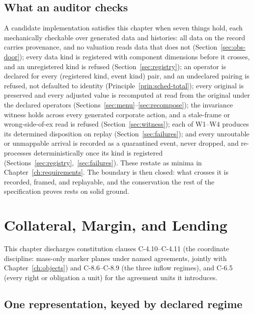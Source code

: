 \documentclass[11pt,a4paper]{article}
\begin{document}
\subsection{What an auditor checks}

A candidate implementation satisfies this chapter when seven things hold, each mechanically
checkable over generated data and histories: all data on the record carries provenance,
and no valuation reads data that does not (Section~\ref{sec:obs-door}); every data kind
is registered with component dimensions before it crosses, and an unregistered kind is
refused (Section~\ref{sec:registry}); an operator is declared for every (registered kind,
event kind) pair, and an undeclared pairing is refused, not defaulted to identity
(Principle~\ref{prin:sched-total}); every original is preserved and every adjusted value is
recomputed at read from the original under the declared operators
(Sections~\ref{sec:menu}--\ref{sec:recompose}); the invariance witness holds across every
generated corporate action, and a stale-frame or wrong-side-of-ex read is refused
(Section~\ref{sec:witness}); each of W1--W4 produces its determined disposition on
replay (Section~\ref{sec:failures}); and every unroutable or unmappable arrival is recorded
as a quarantined event, never dropped, and re-processes deterministically once its kind is
registered (Sections~\ref{sec:registry},~\ref{sec:failures}). These restate as minima in
Chapter~\ref{ch:requirements}. The boundary is then closed: what crosses it is recorded,
framed, and replayable, and the conservation the rest of the specification proves rests on
solid ground.


\section{Collateral, Margin, and Lending}\label{ch:collateral}

This chapter discharges constitution clauses C-4.10--C-4.11 (the coordinate discipline: mass-only marker planes under named agreements, jointly with Chapter~\ref{ch:objects}) and C-8.6--C-8.9 (the three inflow regimes), and C-6.5 (every right or obligation a unit) for the agreement units it introduces.

\subsection{One representation, keyed by declared regime}
\end{document}
